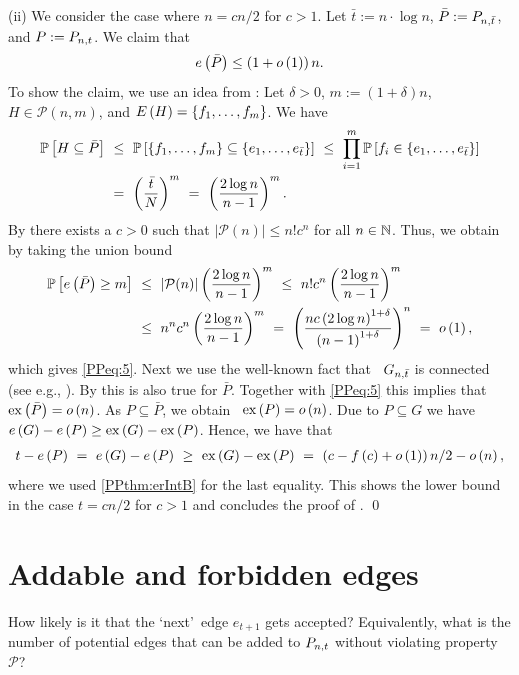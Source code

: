 (ii) We consider the case where $n=cn/2$ for $c>1$. Let $\bar{t}:=n \cdot \log n$, $\bar{P}:=P_{n,\bar{t}}$, and $P:=P_{n,t}$. We claim that \whp\
\begin{align}\label{PPeq:5}
	e\left({\bar{P}}\right)\leq \left(1+o\left(1\right)\right)n.
\end{align}
To show the claim, we use an idea from \cite{GerkeSchlatterStegerTaraz2008}: Let $\delta>0$, $m:=(1+\delta)n$, $H\in\mathcal{P}(n,m)$, and $E\left(H\right)=\left\{f_1, \ldots, f_m\right\}$. We have
\begin{align*}
\mathbb{P}\left[H\subseteq\bar{P}\right]
~&\leq~\mathbb{P}\left[\left\{f_1, \ldots, f_m\right\}\subseteq\left\{e_1, \ldots, e_{\bar{t}}\right\}\right]
~\leq~\prod_{i=1}^{m}\mathbb{P}\left[f_i\in \left\{e_1, \ldots, e_{\bar{t}}\right\}\right]
\\
&=~\left(\frac{\bar{t}}{N}\right)^m
~=~\left(\frac{2\log n}{n-1}\right)^m.
\end{align*}
By  there exists a $c>0$ such that $\left|\mathcal{P}(n)\right|\leq n!c^n$ for all $n\in\mathbb{N}$. Thus, we obtain by taking the union bound
\begin{align*}
\mathbb{P}\left[e\left({\bar{P}}\right)\geq m\right]&~\leq~ \left|\mathcal{P}(n)\right|\left(\frac{2\log n}{n-1}\right)^m
~\leq~
n!c^n\left(\frac{2\log n}{n-1}\right)^m
\\
&~\leq~
n^nc^n\left(\frac{2\log n}{n-1}\right)^m
~=~
\left(\frac{nc\left(2\log n\right)^{1+\delta}}{\left(n-1\right)^{1+\delta}}\right)^n
~=~o\left(1\right),
\end{align*}
which gives \eqref{PPeq:5}. Next we use the well-known fact that \whp\ $G_{n,\bar{t}}$ is connected (see e.g., \cite{ErdoesRenyi1959}). By  this is also true for $\bar{P}$. Together with \eqref{PPeq:5} this implies that \whp\ $\operatorname{ex}\left(\bar{P}\right)=o\left(n\right)$. As $P\subseteq\bar{P}$, we obtain \whp\ $\operatorname{ex}\left(P\right)=o\left(n\right)$. Due to $P\subseteq G$ we have $e\left({G}\right)-e\left({P}\right)\geq \operatorname{ex}\left(G\right)-\operatorname{ex}\left(P\right)$. Hence, we have that \whp\
\begin{align*}
t-e\left({P}\right)
~=~e\left({G}\right)-e\left({P}\right)
~\geq~\operatorname{ex}\left(G\right)-\operatorname{ex}\left(P\right)
~=~\left(c-f\left(c\right)+o\left(1\right)\right)n/2-o\left(n\right),
\end{align*}
where we used \Cref{PPthm:erInt}\ref{PPthm:erIntB} for the last equality. This shows the lower bound in the case $t=cn/2$ for $c>1$ and concludes the proof of .
\qed


\section{Addable and forbidden edges}\label{PPsec:proof_coro}
How likely is it that the \lq next\rq\ edge $e_{t+1}$ gets accepted? Equivalently, what is the number of potential edges that can be added to $P_{n,t}$ without violating property $\mathcal{P}$?

